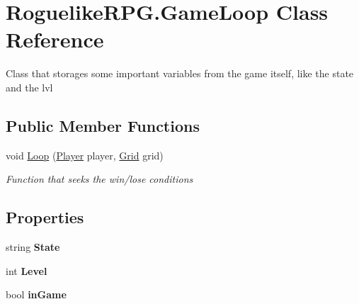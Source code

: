 \hypertarget{class_roguelike_r_p_g_1_1_game_loop}{}\section{Roguelike\+R\+P\+G.\+Game\+Loop Class Reference}
\label{class_roguelike_r_p_g_1_1_game_loop}


Class that storages some important variables from the game itself, like the state and the lvl  


\subsection*{Public Member Functions}
\begin{DoxyCompactItemize}
\item 
void \mbox{\hyperlink{class_roguelike_r_p_g_1_1_game_loop_aa012d706ad4d98f0f6fb321d37638c3c}{Loop}} (\mbox{\hyperlink{class_roguelike_r_p_g_1_1_player}{Player}} player, \mbox{\hyperlink{class_roguelike_r_p_g_1_1_grid}{Grid}} grid)
\begin{DoxyCompactList}\small\item\em Function that seeks the win/lose conditions \end{DoxyCompactList}\end{DoxyCompactItemize}
\subsection*{Properties}
\begin{DoxyCompactItemize}
\item 
\mbox{\label{class_roguelike_r_p_g_1_1_game_loop_aab86497d0428409f1d5b8412f8ac775a}} 
string {\bfseries State}
\item 
\mbox{\label{class_roguelike_r_p_g_1_1_game_loop_a636d816b0a16620f1776cbdaeadb9f6b}} 
int {\bfseries Level}
\item 
\mbox{\label{class_roguelike_r_p_g_1_1_game_loop_ad53ffbdbf9f9780b9ae78bef180806fd}} 
bool {\bfseries in\+Game}
\end{DoxyCompactItemize}


